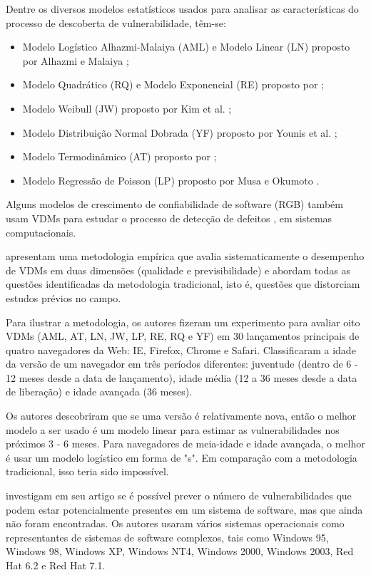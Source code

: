 Dentre os diversos modelos estatísticos usados para analisar as características do processo de descoberta de vulnerabilidade, têm-se:

\begin{itemize}
\item Modelo Logístico Alhazmi-Malaiya (AML) e Modelo Linear (LN) proposto por Alhazmi e Malaiya \cite{Alhazmi2006};
\item Modelo Quadrático (RQ) e Modelo Exponencial (RE) proposto por \cite{Rescorla2005};
\item Modelo Weibull (JW) proposto por Kim et al. \cite{Joh2008a};
\item Modelo Distribuição Normal Dobrada (YF) proposto por Younis et al. \cite{Younis2011};
\item Modelo Termodinâmico (AT) proposto por \cite{Anderson2002};
\item Modelo Regressão de Poisson (LP) proposto por Musa e Okumoto \cite{Musa:1984:LPE:800054.801975}.
\end{itemize}

Alguns modelos de crescimento de confiabilidade de software (RGB) também usam VDMs para estudar o processo de detecção de defeitos \cite{Ozment2006}, \cite{Musa2004} em sistemas computacionais.

 apresentam uma metodologia empírica que avalia sistematicamente o desempenho de VDMs em duas dimensões (qualidade e previsibilidade) e abordam todas as questões identificadas da metodologia tradicional, isto é, questões que distorciam estudos prévios no campo. 

Para ilustrar a metodologia, os autores fizeram um experimento para avaliar oito VDMs (AML, AT, LN, JW, LP, RE, RQ e YF) em 30 lançamentos principais de quatro navegadores da Web: IE, Firefox, Chrome e Safari. Classificaram a idade da versão de um navegador em três períodos diferentes: juventude (dentro de 6 - 12 meses desde a data de lançamento), idade média (12 a 36 meses desde a data de liberação) e idade avançada (36 meses). 

Os autores descobriram que se uma versão é relativamente nova, então o melhor modelo a ser usado é um modelo linear para estimar as vulnerabilidades nos próximos 3 - 6 meses. Para navegadores de meia-idade e idade avançada, o melhor é usar um modelo logístico em forma de "s". Em comparação com a metodologia tradicional, isso teria sido impossível.

 investigam em seu artigo se é possível prever o número de vulnerabilidades que podem estar potencialmente presentes em um sistema de software, mas que ainda não foram encontradas. Os autores usaram vários sistemas operacionais como representantes de sistemas de software complexos, tais como Windows 95, Windows 98, Windows XP, Windows NT4, Windows 2000, Windows 2003, Red Hat 6.2 e Red Hat 7.1.

